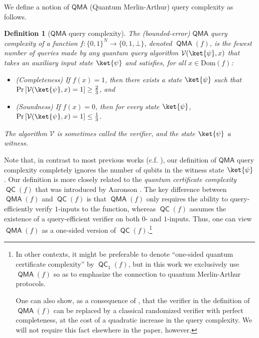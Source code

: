 \documentclass[10pt,a4paper]{article}
\newtheorem{definition}[theorem]{Definition}
\newcommand{\Dom}{\mathrm{Dom}}
\DeclareMathOperator{\QMA}{\mathsf{QMA}}
\DeclareMathOperator{\QC}{\mathsf{QC}}
\begin{document}
We define a notion of $\mathsf{QMA}$ (Quantum Merlin-Arthur) query complexity as follows.

\begin{definition}[$\mathsf{QMA}$ query complexity]
\label{def:qma_query_complexity}
The \emph{(bounded-error) $\mathsf{QMA}$ query complexity} of a function $f: \{0,1\}^N \to \{0,1,\bot\}$, denoted $\QMA(f)$, is the fewest number of queries made by any quantum query algorithm $\mathcal{V}(\ket{\psi}, x)$ that takes an auxiliary input state $\ket{\psi}$ and satisfies, for all $x \in \Dom(f)$:
\begin{itemize}
\item (Completeness) If $f(x) = 1$, then there exists a state $\ket{\psi}$ such that $\Pr\left[\mathcal{V}(\ket{\psi}, x) = 1 \right] \ge \frac{2}{3}$, and
\item (Soundness) If $f(x) = 0$, then for every state $\ket{\psi}$, $\Pr\left[\mathcal{V}(\ket{\psi}, x) = 1 \right] \le \frac{1}{3}$.
\end{itemize}
The algorithm $\mathcal{V}$ is sometimes called the \emph{verifier}, and the state $\ket{\psi}$ a \emph{witness}.
\end{definition}

Note that, in contrast to most previous works (c.f. \cite{RS04,AKKT20,ST19}), our definition of $\mathsf{QMA}$ query complexity completely ignores the number of qubits in the witness state $\ket{\psi}$. Our definition is more closely related to the \textit{quantum certificate complexity} $\QC(f)$ that was introduced by Aaronson \cite{Aar08}. The key difference between $\QMA(f)$ and $\QC(f)$ is that $\QMA(f)$ only requires the ability to query-efficiently verify $1$-inputs to the function, whereas $\QC(f)$ assumes the existence of a query-efficient verifier on both $0$- and $1$-inputs. Thus, one can view $\QMA(f)$ as a one-sided version of $\QC(f)$.\footnote{In other contexts, it might be preferable to denote ``one-sided quantum certificate complexity'' by $\QC_1(f)$, but in this work we exclusively use $\QMA(f)$ so as to emphasize the connection to quantum Merlin-Arthur protocols.

One can also show, as a consequence of \cite[Theorems 4 and 7]{Aar08}, that the verifier in the definition of $\QMA(f)$ can be replaced by a classical randomized verifier with perfect completeness, at the cost of a quadratic increase in the query complexity. We will not require this fact elsewhere in the paper, however.} %
\end{document}
